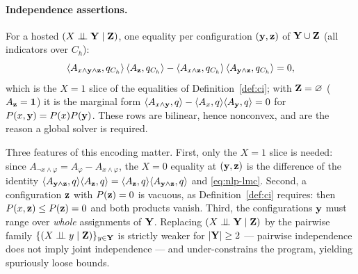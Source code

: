 \documentclass{article} %
\newcommand{\indep}{\perp\!\!\!\perp}
\begin{document}
\paragraph{Independence assertions.}
For a hosted $(X\indep \bY\mid \bZ)$, one equality per configuration
$(\mathbf{y},\mathbf{z})$ of $\mathbf{Y}\cup\mathbf{Z}$ (all indicators over $C_h$):
\begin{equation}\label{eq:nlp-lmc}
  \langle A_{x\wedge\mathbf{y}\wedge\mathbf{z}},q_{C_h}\rangle\,\langle A_{\mathbf{z}},q_{C_h}\rangle
  -\langle A_{x\wedge\mathbf{z}},q_{C_h}\rangle\,\langle A_{\mathbf{y}\wedge\mathbf{z}},q_{C_h}\rangle=0 ,
\end{equation}
which is the $X{=}1$ slice of the equalities of Definition~\ref{def:ci}; with
$\mathbf{Z}=\varnothing$ ($A_{\mathbf{z}}=\mathbf 1$) it is the marginal form
$\langle A_{x\wedge\mathbf{y}},q\rangle-\langle A_{x},q\rangle\langle A_{\mathbf{y}},q\rangle=0$
for $P(x,\mathbf{y})=P(x)P(\mathbf{y})$. These rows are bilinear, hence nonconvex, and
are the reason a global solver is required.

Three features of this encoding matter. First, only the $X{=}1$ slice is needed:
since $A_{\lnot x\wedge\varphi}=A_\varphi-A_{x\wedge\varphi}$, the $X{=}0$ equality
at $(\mathbf{y},\mathbf{z})$ is the difference of the identity
$\langle A_{\mathbf{y}\wedge\mathbf{z}},q\rangle\langle A_{\mathbf{z}},q\rangle=\langle A_{\mathbf{z}},q\rangle\langle A_{\mathbf{y}\wedge\mathbf{z}},q\rangle$
and \eqref{eq:nlp-lmc}. Second, a configuration $\mathbf{z}$ with $P(\mathbf{z})=0$ is vacuous, as
Definition~\ref{def:ci} requires: then $P(x,\mathbf{z})\le P(\mathbf{z})=0$ and both products
vanish. Third, the configurations $\mathbf{y}$ must range over \emph{whole} assignments
of $\mathbf{Y}$. Replacing $(X\indep \bY\mid \bZ)$ by the pairwise family
$\{(X\indep y\mid \bZ)\}_{y\in \bY}$ is strictly weaker for $|\mathbf{Y}|\ge2$ ---
pairwise independence does not imply joint independence --- and under-constrains
the program, yielding spuriously loose bounds.
\end{document}
